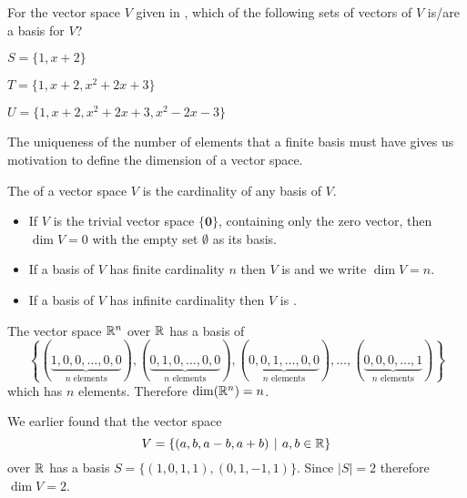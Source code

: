 \begin{exercise}
    For the vector space $V$ given in , which of the following sets of vectors of $V$ is/are a basis for $V$?
    \begin{partquestions}{\alph*}
        \item $S = \{1, x + 2\}$
        \item $T = \{1, x + 2, x^2 + 2x + 3\}$
        \item $U = \{1, x + 2, x^2 + 2x + 3, x^2 - 2x - 3\}$
    \end{partquestions}
\end{exercise}

The uniqueness of the number of elements that a finite basis must have gives us motivation to define the dimension of a vector space.

\begin{definition}
    The  of a vector space $V$ is the cardinality of any basis of $V$.
    \begin{itemize}
        \item If $V$ is the trivial vector space $\{\mathbf{0}\}$, containing only the zero vector, then $\dim{V} = 0$ with the empty set $\emptyset$ as its basis.
        \item If a basis of $V$ has finite cardinality $n$ then $V$ is  and we write $\dim{V} = n$.
        \item If a basis of $V$ has infinite cardinality then $V$ is .
    \end{itemize}
\end{definition}

\begin{example}
    The vector space $\mathbb{R}^n$ over $\mathbb{R}$ has a basis of
    \[
        \left\{(\underbrace{1, 0, 0, \dots, 0, 0}_{n \text{ elements}}), (\underbrace{0, 1, 0, \dots, 0, 0}_{n \text{ elements}}), (\underbrace{0, 0, 1, \dots, 0, 0}_{n \text{ elements}}), \dots, (\underbrace{0, 0, 0, \dots, 1}_{n \text{ elements}})\right\}
    \]
    which has $n$ elements. Therefore $\dim{\R^n} = n$.
\end{example}

\begin{example}
    We earlier found that the vector space
    \[
        V = \{(a, b, a-b, a+b) \vert a, b \in \R\}
    \]
    over $\mathbb{R}$ has a basis $S = \{(1, 0, 1, 1), (0, 1, -1, 1)\}$. Since $|S| = 2$ therefore $\dim{V} = 2$.
\end{example}

